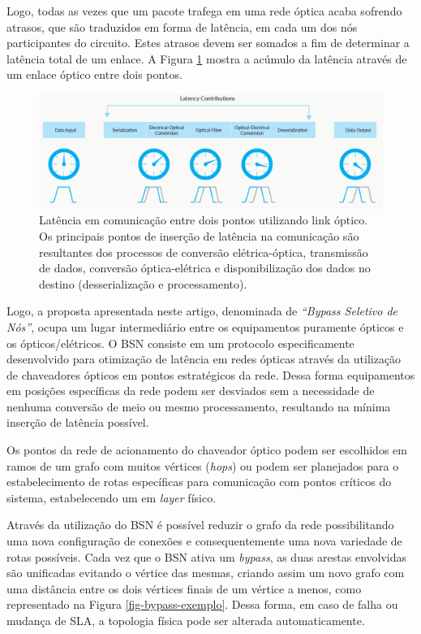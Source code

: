 Logo, todas as vezes que um pacote trafega em uma rede óptica acaba sofrendo atrasos, que são traduzidos em forma de latência, em cada um dos nós participantes do circuito. Estes atrasos devem ser somados a fim de determinar a latência total de um enlace. A Figura \ref{fig_latency_link} mostra a acúmulo da latência através de um enlace óptico entre dois pontos. 

\begin{figure} [!htb]%
	\centering
	\includegraphics[width=1\textwidth]{./figuras/latency-link.png}
	\caption[Latência de Link]{Latência em comunicação entre dois pontos utilizando link óptico. Os principais pontos de inserção de latência na comunicação são resultantes dos processos de conversão elétrica-óptica, transmissão de dados, conversão óptica-elétrica e disponibilização dos dados no destino (desserialização e processamento).}
	\label{fig_latency_link}
\end{figure}

Logo, a proposta apresentada neste artigo, denominada de  \emph{``Bypass Seletivo de Nós''}, ocupa um lugar intermediário entre os equipamentos puramente ópticos e os ópticos/elétricos. O BSN consiste em um protocolo especificamente desenvolvido para otimização de latência em redes ópticas através da utilização de chaveadores ópticos em pontos estratégicos da rede. Dessa forma equipamentos em posições específicas da rede podem ser desviados sem a necessidade de nenhuma conversão de meio ou mesmo processamento, resultando na mínima inserção de latência possível. 

Os pontos da rede de acionamento do chaveador óptico podem ser escolhidos em ramos de um grafo com muitos vértices (\emph{hops}) ou podem ser planejados para o estabelecimento de rotas específicas para comunicação com pontos críticos do sistema, estabelecendo um  em \emph{layer} físico.

Através da utilização do BSN é possível reduzir o grafo da rede possibilitando uma nova configuração de conexões e consequentemente uma nova variedade de rotas possíveis. Cada vez que o BSN ativa um \emph{bypass}, as duas arestas envolvidas são unificadas evitando o vértice das mesmas, criando assim um novo grafo com uma distância entre os dois vértices finais de um vértice a menos, como representado na Figura \ref{fig-bypass-exemplo}. Dessa forma, em caso de falha ou mudança de SLA, a topologia física pode ser alterada automaticamente.

